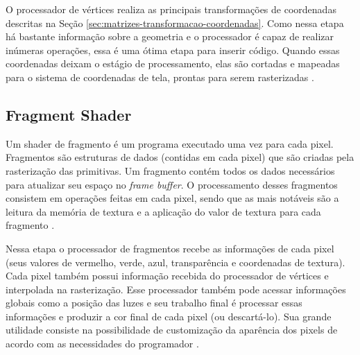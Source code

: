 	\begin{figure}[h!]
		\centering
	\end{figure}
	\nocite{shaderStages}

O processador de vértices realiza as principais transformações de coordenadas descritas na Seção \ref{sec:matrizes-transformacao-coordenadas}. Como nessa etapa há bastante informação sobre a geometria e o processador é capaz de realizar inúmeras operações, essa é uma ótima etapa para inserir código. Quando essas coordenadas deixam o estágio de processamento, elas são cortadas e mapeadas para o sistema de coordenadas de tela, prontas para serem rasterizadas \cite{bailey2007}.

\subsection{Fragment Shader}
\label{sec:fragment-shader}

Um shader de fragmento é um programa executado uma vez para cada pixel. Fragmentos são estruturas de dados (contidas em cada pixel) que são criadas pela rasterização das primitivas. Um fragmento contém todos os dados necessários para atualizar seu espaço no \textit{frame buffer}. O processamento desses fragmentos consistem em operações feitas em cada pixel, sendo que as mais notáveis são a leitura da memória de textura e a aplicação do valor de textura para cada fragmento \cite{GLSLBook}. 

Nessa etapa o processador de fragmentos recebe as informações de cada pixel (seus valores de vermelho, verde, azul, transparência e coordenadas de textura). Cada pixel também possui informação recebida do processador de vértices e interpolada na rasterização. Esse processador também pode acessar informações globais como a posição das luzes e seu trabalho final é processar essas informações e produzir a cor final de cada pixel (ou descartá-lo). Sua grande utilidade consiste na possibilidade de customização da aparência dos pixels de acordo com as necessidades do programador \cite{bailey2007}. 

